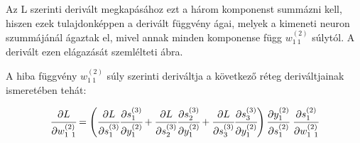 Az L szerinti derivált megkapásához ezt a három komponenst summázni kell, hiszen ezek tulajdonképpen a derivált függvény ágai, melyek a kimeneti neuron szummájánál ágaztak el, mivel annak minden komponense függ $w^{(2)}_{1~1}$ súlytól. A derivált ezen elágazását szemlélteti  ábra.

A hiba függvény $w^{(2)}_{1~1}$ súly szerinti deriváltja a következő réteg deriváltjainak ismeretében tehát:

\begin{equation}
    \cfrac{\partial L}{\partial w^{(2)}_{1~1}} = \left(\cfrac{\partial L}{\partial s^{(3)}_1}\cfrac{\partial s^{(3)}_1}{\partial y^{(2)}_1} + \cfrac{\partial L}{\partial s^{(3)}_2}\cfrac{\partial s^{(3)}_2}{\partial y^{(2)}_1} +\cfrac{\partial L}{\partial s^{(3)}_3} \cfrac{\partial s^{(3)}_3}{\partial y^{(2)}_1}\right)\cfrac{\partial y^{(2)}_1}{\partial s^{(2)}_1}~\cfrac{\partial s^{(2)}_1}{\partial w^{(2)}_{1~1}} 
\end{equation}

